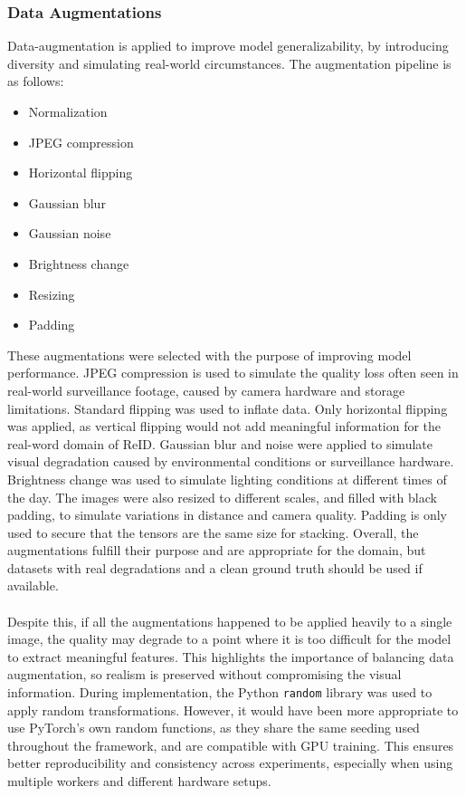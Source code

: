 \subsubsection{Data Augmentations} \label{sec: Dataaugmentation discussion}
Data-augmentation is applied to improve model generalizability, by introducing diversity and simulating real-world circumstances. The augmentation pipeline is as follows:
\begin{itemize}
    \item Normalization 
    \item JPEG compression
    \item Horizontal flipping
    \item Gaussian blur
    \item Gaussian noise
    \item Brightness change
    \item Resizing
    \item Padding
\end{itemize}

\noindent These augmentations were selected with the purpose of improving model performance. JPEG compression is used to simulate the quality loss often seen in real-world surveillance footage, caused by camera hardware and storage limitations. Standard flipping was used to inflate data. Only horizontal flipping was applied, as vertical flipping would not add meaningful information for the real-word domain of \acs{ReID}. Gaussian blur and noise were applied to simulate visual degradation caused by environmental conditions or surveillance hardware. Brightness change was used to simulate lighting conditions at different times of the day. The images were also resized to different scales, and filled with black padding, to simulate variations in distance and camera quality. Padding is only used to secure that the tensors are the same size for stacking. Overall, the augmentations fulfill their purpose and are appropriate for the domain, but datasets with real degradations and a clean ground truth should be used if available. 
\\\\
Despite this, if all the augmentations happened to be applied heavily to a single image, the quality may degrade to a point where it is too difficult for the model to extract meaningful features. This highlights the importance of balancing data augmentation, so realism is preserved without compromising the visual information. During implementation, the Python \texttt{random} library was used to apply random transformations. However, it would have been more appropriate to use PyTorch's own random functions, as they share the same seeding used throughout the framework, and are compatible with GPU training. This ensures better reproducibility and consistency across experiments, especially when using multiple workers and different hardware setups. 

